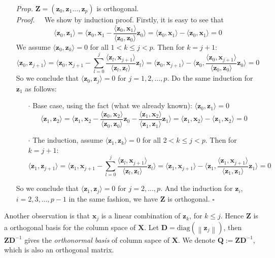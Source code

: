 \documentclass[a4paper, 11pt]{article}
\begin{document}
\begin{itemize}
\begin{itemize}
		\item[\textit{Prop.}] $\bm{Z} = (\bm{z}_0, \bm{z}_1..., \bm{z}_p)$ is orthogonal. \\
		\textit{Proof.~~} We show by induction proof. Firstly, it is easy to see that 
		$$
		\langle \bm{z}_0, \bm{z}_1 \rangle = \langle \bm{z}_0, \bm{x}_1 - \frac{\langle \bm{z}_0, \bm{x}_1 \rangle}{\langle \bm{z}_0, \bm{z}_0 \rangle} \bm{z}_0 \rangle = \langle \bm{z}_0, \bm{x}_1 \rangle - \langle \bm{z}_0, \bm{x}_1 \rangle = 0
		$$
		We assume $\langle \bm{z}_0, \bm{z}_k \rangle = 0$ for all $1 < k\leq j < p$. Then for $k=j+1$: 
		$$
		\langle \bm{z}_0, \bm{z}_{j+1} \rangle = \langle \bm{z}_0, \bm{x}_{j+1}-\sum_{l=0}^j\frac{\langle \bm{z}_l, \bm{x}_{j+1} \rangle}{\langle \bm{z}_l, \bm{z}_l \rangle} \bm{z}_l\rangle = \langle \bm{z}_0, \bm{x}_{j+1} \rangle - \langle \bm{z}_0, \frac{\langle \bm{z}_0, \bm{x}_{j+1} \rangle}{\langle \bm{z}_0, \bm{z}_0\rangle} \bm{z}_0 \rangle = 0
		$$
		So we conclude that $\langle \bm{z}_0, \bm{z}_j \rangle = 0$ for $j=1,2,...,p$. Do the same induction for $\bm{z}_1$ as follows:
		\begin{itemize}
			\item[$\cdot$] Base case, using the fact (what we already known): $\langle \bm{z}_0, \bm{z}_1 \rangle = 0$
			$$
			\langle \bm{z}_1, \bm{z}_{2} \rangle = \langle \bm{z}_1, \bm{x}_{2}-\frac{\langle \bm{z}_0, \bm{x}_{2} \rangle}{\langle \bm{z}_0, \bm{z}_0\rangle} \bm{z}_0 - \frac{\langle \bm{z}_1, \bm{x}_{2} \rangle}{\langle \bm{z}_1, \bm{z}_1\rangle} \bm{z}_1\rangle = \langle \bm{z}_1, \bm{x}_2 \rangle - \langle \bm{z}_1, \bm{x}_2 \rangle = 0
			$$ 
			\item[$\cdot$] The induction, assume $\langle \bm{z}_1, \bm{z}_k \rangle = 0$ for all $2 < k\leq j < p$. Then for $k=j+1$: 
			$$
			\langle \bm{z}_1, \bm{z}_{j+1} \rangle = \langle \bm{z}_1, \bm{x}_{j+1}-\sum_{l=0}^j\frac{\langle \bm{z}_l, \bm{x}_{j+1} \rangle}{\langle \bm{z}_l, \bm{z}_l \rangle} \bm{z}_l\rangle = \langle \bm{z}_1, \bm{x}_{j+1} \rangle - \langle \bm{z}_1, \frac{\langle \bm{z}_1, \bm{x}_{j+1} \rangle}{\langle \bm{z}_1, \bm{z}_1\rangle} \bm{z}_1 \rangle = 0
			$$
		\end{itemize}
		So we conclude that $\langle \bm{z}_1, \bm{z}_j \rangle = 0$ for $j=2,...,p$. And the induction for $\bm{z}_i$, $i=2,3,...,p-1$ in the same fashion, we have $\bm{Z}$ is orthogonal. $\square$
	\end{itemize}
	Another observation is that $\bm{x}_j$ is a linear combination of $\bm{z}_k$, for $k\leq j$. Hence $\bm{Z}$ is a orthogonal basis for the column space of $\bm{X}$. Let $\bm{D}=\text{diag}(\left\|\bm{z}_j\right\|)$, then $\bm{Z}\bm{D}^{-1}$ gives the \emph{orthonormal basis} of column sapce of $\bm{X}$. We denote $\bm{Q}:=\bm{Z}\bm{D}^{-1}$, which is also an orthogonal matrix.


\end{itemize}
\end{document}
